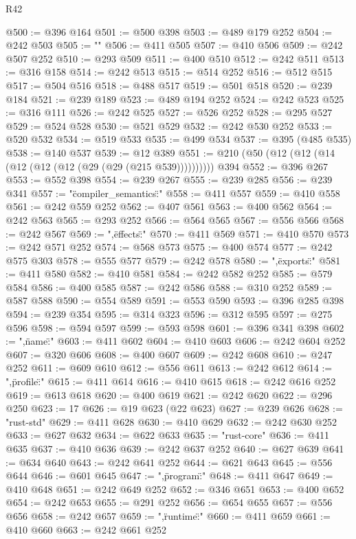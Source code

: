 \begin{lexlean}{R42}
\begin{coremodule}
@500 := @396 @164
@501 := @500 @398
@503 := @489 @179 @252
@504 := @242 @503
@505 := "\n"
@506 := @411 @505
@507 := @410 @506
@509 := @242 @507 @252
@510 := @293 @509
@511 := @400 @510
@512 := @242 @511
@513 := @316 @158
@514 := @242 @513
@515 := @514 @252
@516 := @512 @515
@517 := @504 @516
@518 := @488 @517
@519 := @501 @518
@520 := @239 @184
@521 := @239 @189
@523 := @489 @194 @252
@524 := @242 @523
@525 := @316 @111
@526 := @242 @525
@527 := @526 @252
@528 := @295 @527
@529 := @524 @528
@530 := @521 @529
@532 := @242 @530 @252
@533 := @520 @532
@534 := @519 @533
@535 := @499 @534
@537 := @395 (@485 @535)
@538 := @140 @537
@539 := @12 @389
@551 := @210 (@50 (@12 (@12 (@14 (@12 (@12 (@12 (@29 (@29 (@215 @539)))))))))) @394
@552 := @396 @267
@553 := @552 @398
@554 := @239 @267
@555 := @239 @285
@556 := @239 @341
@557 := "{\"compiler_semantics\":"
@558 := @411 @557
@559 := @410 @558
@561 := @242 @559 @252
@562 := @407 @561
@563 := @400 @562
@564 := @242 @563
@565 := @293 @252
@566 := @564 @565
@567 := @556 @566
@568 := @242 @567
@569 := ",\"effects\":"
@570 := @411 @569
@571 := @410 @570
@573 := @242 @571 @252
@574 := @568 @573
@575 := @400 @574
@577 := @242 @575 @303
@578 := @555 @577
@579 := @242 @578
@580 := ",\"exports\":"
@581 := @411 @580
@582 := @410 @581
@584 := @242 @582 @252
@585 := @579 @584
@586 := @400 @585
@587 := @242 @586
@588 := @310 @252
@589 := @587 @588
@590 := @554 @589
@591 := @553 @590
@593 := @396 @285 @398
@594 := @239 @354
@595 := @314 @323
@596 := @312 @595
@597 := @275 @596
@598 := @594 @597
@599 := @593 @598
@601 := @396 @341 @398
@602 := ",\"name\":"
@603 := @411 @602
@604 := @410 @603
@606 := @242 @604 @252
@607 := @320 @606
@608 := @400 @607
@609 := @242 @608
@610 := @247 @252
@611 := @609 @610
@612 := @556 @611
@613 := @242 @612
@614 := ",\"profile\":"
@615 := @411 @614
@616 := @410 @615
@618 := @242 @616 @252
@619 := @613 @618
@620 := @400 @619
@621 := @242 @620
@622 := @296 @250
@623 := 17
@626 := @19 @623 (@22 @623)
@627 := @239 @626
@628 := "rust-std"
@629 := @411 @628
@630 := @410 @629
@632 := @242 @630 @252
@633 := @627 @632
@634 := @622 @633
@635 := "rust-core"
@636 := @411 @635
@637 := @410 @636
@639 := @242 @637 @252
@640 := @627 @639
@641 := @634 @640
@643 := @242 @641 @252
@644 := @621 @643
@645 := @556 @644
@646 := @601 @645
@647 := ",\"program\":"
@648 := @411 @647
@649 := @410 @648
@651 := @242 @649 @252
@652 := @346 @651
@653 := @400 @652
@654 := @242 @653
@655 := @291 @252
@656 := @654 @655
@657 := @556 @656
@658 := @242 @657
@659 := ",\"runtime\":"
@660 := @411 @659
@661 := @410 @660
@663 := @242 @661 @252
}
\end{coremodule}
\end{lexlean}
